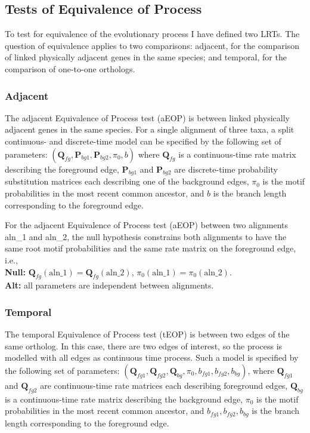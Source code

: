 

\subsection{Tests of Equivalence of Process}
\label{Tests of Equivalence of Process}
To test for equivalence of the evolutionary process I have defined two LRTs. The question of equivalence applies to two comparisons: adjacent, for the comparison of linked physically adjacent genes in the same species; and temporal, for the comparison of one-to-one orthologs.

\subsubsection{Adjacent }

The adjacent Equivalence of Process test (aEOP) is between linked physically adjacent genes in the same species. For a single alignment of three taxa, a split continuous- and discrete-time model can be specified by the following set of parameters: $( \bm{Q}_{fg}, \bm{P}_{bg1}, \bm{P}_{bg2}, \pi_{0}, b ) $ where $\bm{Q}_{fg}$ is a continuous-time rate matrix describing the foreground edge,  $\bm{P}_{bg1}$ and $\bm{P}_{bg2}$ are discrete-time probability substitution matrices each describing one of the background edges, $\pi_{0}$ is the motif probabilities in the most recent common ancestor, and $b$ is the branch length corresponding to the foreground edge. 

For the adjacent Equivalence of Process test (aEOP) between two alignments aln\_1 and aln\_2, the null hypothesis constrains both alignments to have the same root motif probabilities and the same rate matrix on the foreground edge, i.e.,  \\

\textbf{Null:} $\bm{Q}_{fg}(\text{aln\_1}) = \bm{Q}_{fg}(\text{aln\_2})$,  $\pi_0(\text{aln\_1}) = \pi_0(\text{aln\_2})$. \\
\textbf{Alt:} all parameters are independent between alignments. 

\subsubsection{Temporal }

The temporal Equivalence of Process test (tEOP) is between two edges of the same ortholog. In this case, there are two edges of interest, so the process is modelled with all edges as continuous time process. Such a model is specified by the following set of parameters: $( \bm{Q}_{fg1}, \bm{Q}_{fg2}, \bm{Q}_{bg}, \pi_{0}, b_{fg1}, b_{fg2}, b_{bg}) $, where $\bm{Q}_{fg1}$ and $\bm{Q}_{fg2}$ are continuous-time rate matrices each describing foreground edges,  $\bm{Q}_{bg}$ is a continuous-time rate matrix describing the background edge, $\pi_{0}$ is the motif probabilities in the most recent common ancestor, and $ b_{fg1}, b_{fg2}, b_{bg}$ is the branch length corresponding to the foreground edge. 

